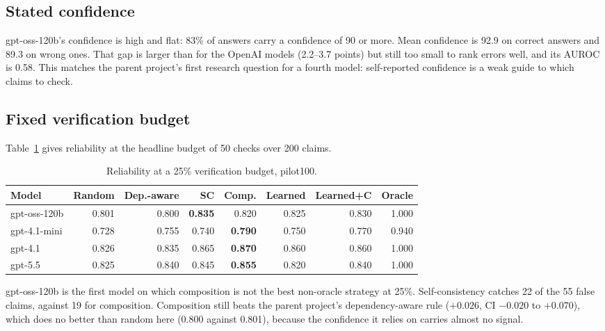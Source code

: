\documentclass[11pt]{article}
\begin{document}
\subsection{Stated confidence}
gpt-oss-120b's confidence is high and flat: 83\% of answers carry a confidence of 90 or
more. Mean confidence is 92.9 on correct answers and 89.3 on wrong ones. That gap is larger
than for the OpenAI models (2.2--3.7 points) but still too small to rank errors well, and
its AUROC is 0.58. This matches the parent project's first research question for a fourth
model: self-reported confidence is a weak guide to which claims to check.

\subsection{Fixed verification budget}
Table~\ref{tab:budget} gives reliability at the headline budget of 50 checks over 200
claims.

\begin{table}[h]
\centering
\small
\caption{Reliability at a 25\% verification budget, pilot100.}
\label{tab:budget}
\begin{tabular}{lrrrrrrr}
\toprule
Model & Random & Dep.-aware & SC & Comp. & Learned & Learned+C & Oracle \\
\midrule
gpt-oss-120b & 0.801 & 0.800 & \textbf{0.835} & 0.820 & 0.825 & 0.830 & 1.000 \\
gpt-4.1-mini & 0.728 & 0.755 & 0.740 & \textbf{0.790} & 0.750 & 0.770 & 0.940 \\
gpt-4.1 & 0.826 & 0.835 & 0.865 & \textbf{0.870} & 0.860 & 0.860 & 1.000 \\
gpt-5.5 & 0.825 & 0.840 & 0.845 & \textbf{0.855} & 0.820 & 0.840 & 1.000 \\
\bottomrule
\end{tabular}
\end{table}

gpt-oss-120b is the first model on which composition is not the best non-oracle strategy at
25\%. Self-consistency catches 22 of the 55 false claims, against 19 for composition.
Composition still beats the parent project's dependency-aware rule ($+0.026$, CI $-0.020$
to $+0.070$), which does no better than random here (0.800 against 0.801), because the
confidence it relies on carries almost no signal.
\end{document}
